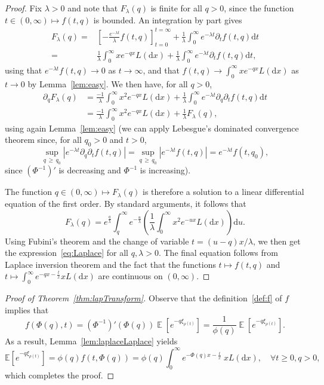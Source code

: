 \documentclass[AHL,Unicode,longabstracts,published]{cedram}
\newcommand{\bbE}{\mathbb{E}}
\DeclareMathOperator{\E}{\mathbb{E}}
\newcommand{\dd}{\mathrm{d}}
\let\oldforall\forall
\renewcommand*{\forall}{\mathrel{\oldforall}}
\begin{document}
\begin{proof}
Fix $\lambda > 0$ and note that $F_{\lambda}(q)$ is finite for all $q > 0$, since the function $t \in (0,\infty) \mapsto f(t,q)$ is bounded. An integration by part gives
\begin{align*}
F_{\lambda}(q)=& \left[-\frac{e^{-\lambda t}}{\lambda}f(t,q) \right]_{t=0}^{t=\infty} + \frac{1}{\lambda} \int_0^{\infty}e^{-\lambda t} \partial _t f(t,q) \dd t \\
=& \frac{1}{\lambda} \int_0^{\infty} xe^{-qx} L(\dd x)+\frac{1}{\lambda} \int_0^{\infty}e^{-\lambda t} \partial _t f(t,q) \dd t,
\end{align*}
using that $e^{-\lambda t}f(t,q) \rightarrow 0 $ as $t\rightarrow \infty$, and that $f(t,q) \rightarrow \int_0^{\infty} xe^{-qx} L(\dd x)$ as $t \rightarrow 0$ by Lemma~\ref{lem:easy}. We then have, for all $q>0$,
\begin{align*}
\partial_q F_{\lambda}(q)&= \frac{-1}{\lambda} \int_0^{\infty} x^2e^{-qx} L(\dd x)+ \frac{1}{\lambda} \int_0^{\infty}e^{-\lambda t} \partial _q\partial _t f(t,q) \dd t \\
&= \frac{-1}{\lambda} \int_0^{\infty} x^2e^{-qx} L(\dd x)+ \frac{1}{\lambda} F_{\lambda}(q),
\end{align*}
using again Lemma~\ref{lem:easy} (we can apply Lebesgue's dominated convergence theorem since, for all $q_0>0$ and $t>0$,
\[
\sup_{q\,\geq\,q_0} \left|e^{-\lambda t}\partial_q \partial_t f(t,q)\right|=\sup_{q\,\geq\,q_0} \left|e^{-\lambda t} f(t,q)\right|=e^{-\lambda t} f(t,q_0),
\]
since $(\Phi^{-1})'$ is decreasing and $\Phi^{-1}$ is increasing).

The function $q \in (0,\infty) \mapsto F_{\lambda}(q)$ is therefore a solution to a linear differential equation of the first order. By standard arguments, it follows that
\[
F_{\lambda}(q)=e^{\frac{q}{\lambda}}\int_q^{\infty} e^{-\frac{u}{\lambda}} \left(\frac{1}{\lambda} \int_0^{\infty} x^2e^{-ux} L(\dd x) \right) \dd u.
\]
Using Fubini's theorem and the change of variable $t=(u-q)x/\lambda$, we then get the expression~\eqref{eq:Laplace} for all $q,\lambda>0$. The final equation follows from Laplace inversion theorem and the fact that the functions $t\mapsto f(t,q)$ and $t \mapsto \int_0^{\infty} e^{-qx -\frac{t}{x}} xL(\dd x)$ are continuous on $(0,\infty)$.
\end{proof}


\begin{proof}[{Proof of Theorem~\ref{thm:lapTransform}}]
Observe that the definition~\eqref{def:f} of $f$ implies that
\[
f(\Phi(q),t) = (\Phi^{-1})'(\Phi(q)) \E\left[e^{-q \xi_{\rho(t)}} \right] = \frac{1}{\phi(q)}\E\left[e^{-q \xi_{\rho(t)}} \right].
\]
As a result, Lemma~\ref{lem:laplaceLaplace} yields
\[
\bbE\left[e^{-q\xi_{\rho(t)}}\right] = \phi(q) f\left(t,\Phi(q)\right)=\phi(q) \int_0^{\infty} e^{-\Phi(q)x -\frac{t}{x}} \ xL(\dd x), \quad \forall t\geq 0, q>0,
\]
which completes the proof.
\end{proof}
\end{document}
